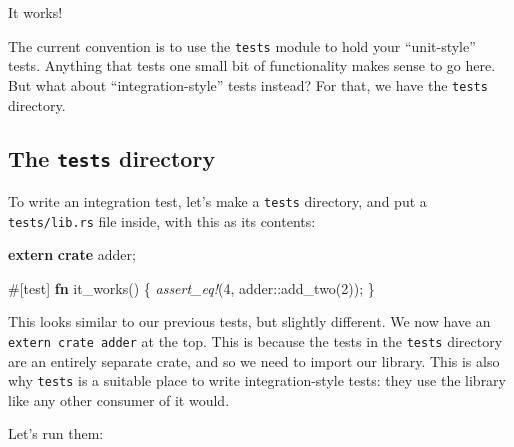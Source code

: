 \documentclass[a4paper,]{book}
\newenvironment{Shaded}{\begin{snugshade}}{\end{snugshade}}
\newcommand{\KeywordTok}[1]{\textcolor[rgb]{0.13,0.29,0.53}{\textbf{{#1}}}}
\newcommand{\DecValTok}[1]{\textcolor[rgb]{0.00,0.00,0.81}{{#1}}}
\newcommand{\PreprocessorTok}[1]{\textcolor[rgb]{0.56,0.35,0.01}{\textit{{#1}}}}
\newcommand{\AttributeTok}[1]{\textcolor[rgb]{0.77,0.63,0.00}{{#1}}}
\newcommand{\NormalTok}[1]{{#1}}
\begin{document}
It works!

The current convention is to use the \texttt{tests} module to hold your
``unit-style'' tests. Anything that tests one small bit of functionality
makes sense to go here. But what about ``integration-style'' tests
instead? For that, we have the \texttt{tests} directory.

\subsection{\texorpdfstring{The \texttt{tests}
directory}{The tests directory}}\label{the-tests-directory}

To write an integration test, let's make a \texttt{tests} directory, and
put a \texttt{tests/lib.rs} file inside, with this as its contents:

\begin{Shaded}
\begin{Highlighting}[]
\KeywordTok{extern} \KeywordTok{crate} \NormalTok{adder;}

\AttributeTok{#[}\NormalTok{test}\AttributeTok{]}
\KeywordTok{fn} \NormalTok{it_works() \{}
    \PreprocessorTok{assert_eq!}\NormalTok{(}\DecValTok{4}\NormalTok{, adder::add_two(}\DecValTok{2}\NormalTok{));}
\NormalTok{\}}
\end{Highlighting}
\end{Shaded}

This looks similar to our previous tests, but slightly different. We now
have an \texttt{extern\ crate\ adder} at the top. This is because the
tests in the \texttt{tests} directory are an entirely separate crate,
and so we need to import our library. This is also why \texttt{tests} is
a suitable place to write integration-style tests: they use the library
like any other consumer of it would.

Let's run them:
\end{document}
